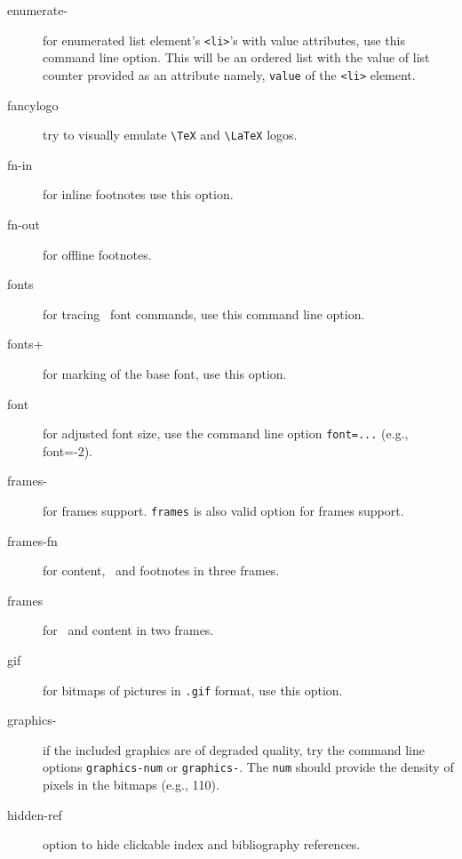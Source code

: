 \begin{description}
\item[enumerate-] for enumerated list element's \verb=<li>='s with
  value attributes, use this command line option. This will be an
  ordered list with the value of list counter provided as an attribute
  namely, \verb=value= of the \verb=<li>= element.

\item[fancylogo] try to visually emulate \verb|\TeX| and \verb|\LaTeX| logos.

\item[fn-in] for inline footnotes use this option.

\item[fn-out] for offline footnotes.

\item[fonts] for tracing \latex\ font commands, use this command line
  option.

\item[fonts+] for marking of the base font, use this option.

\item[font] for adjusted font size, use the command line option
  \verb+font=...+ (e.g., font=-2).

\item[frames-] for frames support. \verb=frames= is also valid option
  for frames support.

\item[frames-fn] for content, \ and footnotes in
  three frames.

\item[frames] for \ and content in two frames.


\item[gif] for bitmaps of pictures in \verb=.gif= format, use this
  option.

\item[graphics-] if the included graphics are of degraded quality, try
  the command line options \verb=graphics-num= or \verb=graphics-=.
  The \verb=num= should provide the density of pixels in the bitmaps
  (e.g., 110).


\item[hidden-ref] option to hide clickable index and bibliography
  references.



\end{description}
